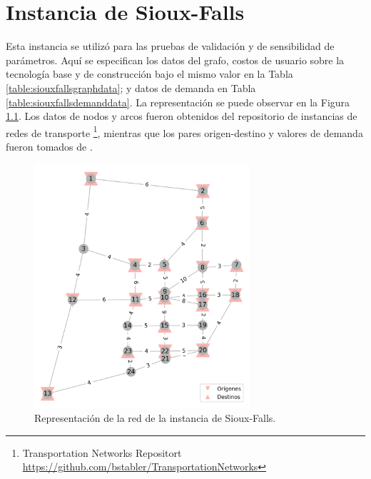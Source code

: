 \chapter{Instancia de Sioux-Falls}
\label{sect:siouxfallsdata}

Esta instancia se utilizó para las pruebas de validación y de sensibilidad de parámetros. Aquí se especifican los datos del grafo, costos de usuario sobre la tecnología base y de construcción bajo el mismo valor en la Tabla \ref{table:siouxfallsgraphdata}; y datos de demanda en Tabla \ref{table:siouxfallsdemanddata}. La representación se puede observar en la Figura \ref{fig:siouxfallsapendix}. Los datos de nodos y arcos fueron obtenidos del repositorio de instancias de redes de transporte \footnote{Transportation Networks Repositort \url{https://github.com/bstabler/TransportationNetworks}}, mientras que los pares origen-destino y valores de demanda fueron tomados de \textcite{Liu2019}.

\begin{figure}[h!]
\centering
\includegraphics[width=8cm]{../resources/sioux_falls_odpairs.png}
\caption{Representación de la red de la instancia de Sioux-Falls.}
\label{fig:siouxfallsapendix}
\end{figure}

